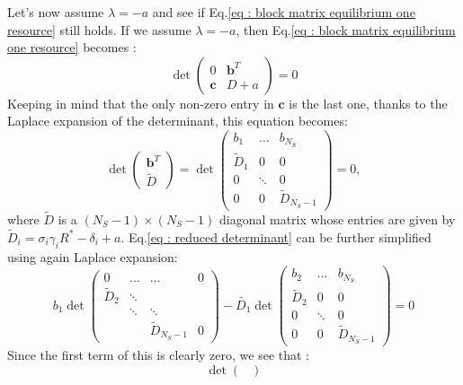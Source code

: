 \documentclass[12pt]{article}
\newcommand{\vect}[1]{\textbf{#1}}
\begin{document}
\begin{appendices}
	Let's now assume $\lambda = -a$ and see if Eq.\eqref{eq : block matrix equilibrium one resource} still holds. If we assume $\lambda=-a$, then Eq.\eqref{eq : block matrix equilibrium one resource} becomes :
	\begin{equation}
	\det
	\begin{pmatrix}
		0 & \vect{b}^T\\
		\vect{c} & D+a  
	\end{pmatrix} =0
	\end{equation}
	Keeping in mind that the only non-zero entry in $\vect{c}$ is the last one, thanks to the Laplace expansion of the determinant, this equation becomes:
	\begin{equation}
		\det
		\begin{pmatrix}
			\vect{b}^T \\
			\tilde{D}
		\end{pmatrix}
		=
		\det
		\begin{pmatrix}
			b_1 & \dots & b_{N_S} \\
			\tilde{D}_1 & 0 & 0 \\
			0 & \ddots & 0 \\
			0 & 0 & \tilde{D}_{N_S-1}
		\end{pmatrix}
		=0, \label{eq : reduced determinant}
	\end{equation}
	where $\tilde{D}$ is a $(N_S-1)\times(N_S-1)$ diagonal matrix whose entries are given by $\tilde{D}_i = \sigma_i \gamma_i R^* - \delta_i +a$. Eq.\eqref{eq : reduced determinant} can be further simplified using again Laplace expansion:
	\begin{equation}
		b_1 \det
		\begin{pmatrix}
			0 & \dots & \dots& 0 \\
			\tilde{D}_2 & \ddots & & \\
			 & \ddots & \ddots & \\
			&  & \tilde{D}_{N_S-1} & 0
		\end{pmatrix}
		- \tilde{D_1} \det
		\begin{pmatrix}
			b_2 & \dots & b_{N_S} \\
			\tilde{D}_2 &  0 & 0 \\
			0 & \ddots & 0 \\
			0 & 0 & \tilde{D}_{N_S-1} 
		\end{pmatrix} = 0
	\end{equation}
	Since the first term of this is clearly zero, we see that :
	\begin{equation}
		\det
		\begin{pmatrix}

\end{pmatrix}
\end{equation}
\end{appendices}
\end{document}
